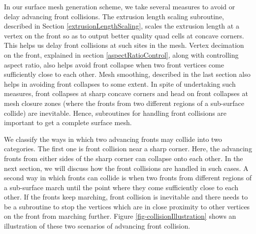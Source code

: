 In our surface mesh generation scheme, we take several measures to avoid or delay advancing front collisions. The extrusion length scaling subroutine, described in Section \ref{extrusionLengthScaling}, scales the extrusion length at a vertex on the front so as to output better quality quad cells at concave corners. This helps us delay front collisions at such sites in the mesh. Vertex decimation on the front, explained in section \ref{aspectRatioControl}, along with controlling aspect ratio, also helps avoid front collapse when two front vertices come sufficiently close to each other. Mesh smoothing, described in the last section also helps in avoiding front collapses to some extent. In spite of undertaking such measures, front collapses at sharp concave corners and head on front collapses at mesh closure zones (where the fronts from two different regions of a sub-surface collide) are inevitable. Hence, subroutines for handling front collisions are important to get a complete surface mesh.

We classify the ways in which two advancing fronts may collide into two categories. The first one is front collision near a sharp corner. Here, the advancing fronts from either sides of the sharp corner can collapse onto each other. In the next section, we will discuss how the front collisions are handled in such cases. A second way in which fronts can collide is when two fronts from different regions of a sub-surface march until the point where they come sufficiently close to each other. If the fronts keep marching, front collision is inevitable and there needs to be a subroutine to stop the vertices which are in close proximity to other vertices on the front from marching further. Figure \ref{fig-collisionIllustration} shows an illustration of these two scenarios of advancing front collision.

